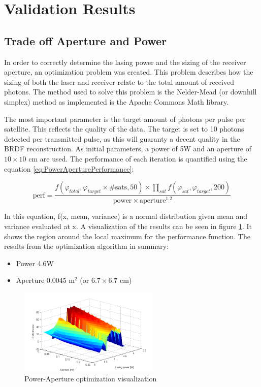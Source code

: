 \section{Validation Results}
\label{sec:ValidationResults}

\subsection{Trade off Aperture and Power}
\label{sec:PowerApertureTradeoff}

In order to correctly determine the lasing power and the sizing of the receiver aperture, an optimization problem was created. This problem describes how the sizing of both the laser and receiver relate to the total amount of received photons. The method used to solve this problem is the Nelder-Mead (or downhill simplex) method as implemented is the Apache Commons Math library.

The most important parameter is the target amount of photons per pulse per satellite. This reflects the quality of the data. The target is set to 10 photons detected per transmitted pulse, as this will guaranty a decent quality in the BRDF reconstruction. As initial parameters, a power of 5W and an aperture of $10\times10$ cm are used. The performance of each iteration is quantified using the equation \ref{eq:PowerAperturePerformance}:

\begin{equation}
	\text{perf} = \frac {f(\varphi_{total}, \varphi_{target} \times \text{\# sats}, 50) \times 
												\displaystyle\prod_{sat} f(\varphi_{sat}, \varphi_{target}, 200) }
											{ \text{power} \times \text{aperture}^{1.2}}
	\label{eq:PowerAperturePerformance}
\end{equation}

In this equation, f(x, mean, variance) is a normal distribution given mean and variance evaluated at x. A visualization of the results can be seen in figure \ref{fig:PowerAperturePerformance}. It shows the region around the local maximum for the performance function. The results from the optimization algorithm in summary:

\begin{itemize}
	\item Power 4.6W
	\item Aperture 0.0045 m$^2$ (or $6.7\times6.7$ cm)
\end{itemize}

\begin{figure}[ht]
	\centering
	\includegraphics[width=0.6\textwidth]{chapters/img/optimize-PowerAperture.png}%
		\caption{Power-Aperture optimization visualization}%
		\label{fig:PowerAperturePerformance}%
\end{figure}

